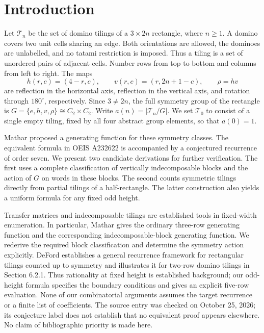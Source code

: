 \section{Introduction}\label{sec:intro}

Let $\mathcal T_n$ be the set of domino tilings of a $3\times 2n$
rectangle, where $n\ge1$. A domino covers two unit cells sharing an
edge. Both orientations are allowed, the dominoes are unlabelled,
and no tatami restriction is imposed. Thus a tiling is a set of
unordered pairs of adjacent cells.
Number rows from top to bottom and columns from left to right.
The maps
\[
 h(r,c)=(4-r,c),\qquad v(r,c)=(r,2n+1-c),\qquad \rho=hv
\]
are reflection in the horizontal axis, reflection in the vertical
axis, and rotation through $180^\circ$, respectively.
Since $3\ne2n$, the full symmetry group of the rectangle is
$G=\{e,h,v,\rho\}\cong C_2\times C_2$.
Write $a(n)=|\mathcal T_n/G|$. We set $\mathcal T_0$ to consist of a
single empty tiling, fixed by all four abstract group elements, so
that $a(0)=1$.

Mathar \cite[Table 10, Conjecture 6]{mathar2013} proposed a generating
function for these symmetry classes. The equivalent formula in
OEIS A232622 \cite{oeis} is accompanied by a conjectured recurrence
of order seven. We present two candidate derivations for further verification.
The first uses a complete classification of vertically
indecomposable blocks and the action of $G$ on words in these blocks.
The second counts symmetric tilings directly from partial tilings
of a half-rectangle.
The latter construction also yields a uniform formula for any fixed
odd height.

Transfer matrices and indecomposable tilings are established tools
in fixed-width enumeration. In particular, Mathar
\cite[Sections 2.1--2.3]{mathar2014} gives the ordinary three-row
generating function and the corresponding indecomposable-block
generating function. We rederive the required block classification
and determine the symmetry action explicitly.
DeFord \cite[Theorem 6.1]{deford} establishes a general recurrence
framework for rectangular tilings counted up to symmetry and
illustrates it for two-row domino tilings in Section 6.2.1.
Thus rationality at fixed height is established background;
our odd-height formula specifies the boundary conditions and
gives an explicit five-row evaluation.
None of our
combinatorial arguments assumes the target recurrence or a finite
list of coefficients.
The source entry was checked on October 25, 2026; its conjecture
label does not establish that no equivalent proof appears elsewhere.
No claim of bibliographic priority is made here.

